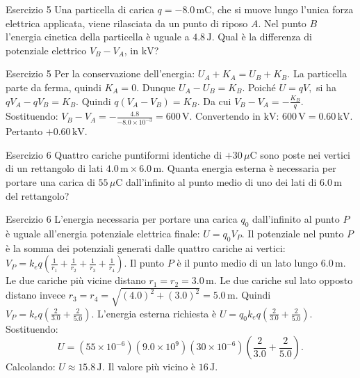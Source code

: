 \documentclass[a4paper]{article}
\begin{document}
\begin{snippetexercise}{Esercizio 5}
    Una particella di carica \(q = -8.0\,\mathrm{mC}\), che si muove lungo
    l'unica forza elettrica applicata, viene rilasciata da un punto di riposo
    \(A\). Nel punto \(B\) l'energia cinetica della particella è uguale a
    \(4.8\,\mathrm{J}\). Qual è la differenza di potenziale elettrico
    \(V_B - V_A\), in \(\mathrm{kV}\)?

\end{snippetexercise}
\begin{snippetsolution}{Esercizio 5}
    Per la conservazione dell'energia:
    \(U_A + K_A = U_B + K_B.\)
    La particella parte da ferma, quindi
    \(K_A = 0.\)
    Dunque
    \(U_A - U_B = K_B.\)
    Poiché
    \(U = qV,\)
    si ha
    \(qV_A - qV_B = K_B.\)
    Quindi
    \(q(V_A - V_B) = K_B.\)
    Da cui
    \(V_B - V_A = -\frac{K_B}{q}.\)
    Sostituendo:
    \(V_B - V_A = -\frac{4.8}{-8.0 \times 10^{-3}} = 600\,\mathrm{V}.\)
    Convertendo in \(\mathrm{kV}\):
    \(600\,\mathrm{V} = 0.60\,\mathrm{kV}.\)
    Pertanto
    \(\boxed{+0.60\,\mathrm{kV}}.\)
\end{snippetsolution}
\begin{snippetexercise}{Esercizio 6}
    Quattro cariche puntiformi identiche di \(+30\,\mu\mathrm{C}\) sono poste
    nei vertici di un rettangolo di lati \(4.0\,\mathrm{m} \times 6.0\,\mathrm{m}\).
    Quanta energia esterna è necessaria per portare una carica di
    \(55\,\mu\mathrm{C}\) dall'infinito al punto medio di uno dei lati di
    \(6.0\,\mathrm{m}\) del rettangolo?

\end{snippetexercise}
\begin{snippetsolution}{Esercizio 6}
    L'energia necessaria per portare una carica \(q_0\) dall'infinito al punto
    \(P\) è uguale all'energia potenziale elettrica finale:
    \(U = q_0 V_P.\)
    Il potenziale nel punto \(P\) è la somma dei potenziali generati dalle
    quattro cariche ai vertici:
    \(V_P = k_e q \left( \frac{1}{r_1} + \frac{1}{r_2} + \frac{1}{r_3} + \frac{1}{r_4} \right).\)
    Il punto \(P\) è il punto medio di un lato lungo \(6.0\,\mathrm{m}\).
    Le due cariche più vicine distano
    \(r_1 = r_2 = 3.0\,\mathrm{m}.\)
    Le due cariche sul lato opposto distano invece
    \(r_3 = r_4 = \sqrt{(4.0)^2 + (3.0)^2} = 5.0\,\mathrm{m}.\)
    Quindi
    \(V_P = k_e q \left( \frac{2}{3.0} + \frac{2}{5.0} \right).\)
    L'energia esterna richiesta è
    \(U = q_0 k_e q \left( \frac{2}{3.0} + \frac{2}{5.0} \right).\)
    Sostituendo:
    \[
        U =
        \left(55 \times 10^{-6}\right)
        \left(9.0 \times 10^9\right)
        \left(30 \times 10^{-6}\right)
        \left(
            \frac{2}{3.0}
            +
            \frac{2}{5.0}
        \right).
    \]
    Calcolando:
    \(U \approx 15.8\,\mathrm{J}.\)
    Il valore più vicino è
    \(\boxed{16\,\mathrm{J}}.\)
\end{snippetsolution}
\end{document}
